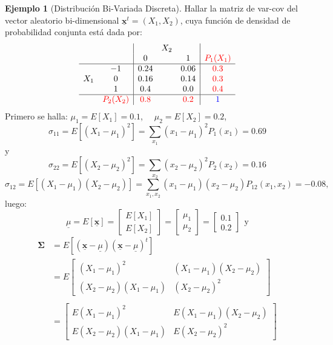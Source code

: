 \documentclass[
]{book}
\theoremstyle{definition}
\theoremstyle{definition}
\newtheorem{example}{Ejemplo}[chapter]
\theoremstyle{definition}
\theoremstyle{definition}
\theoremstyle{remark}
\begin{document}
\begin{example}[Distribución Bi-Variada Discreta]
\protect\hypertarget{exm:distrib-bivar}{}\label{exm:distrib-bivar}Hallar la matriz de var-cov del vector aleatorio bi-dimensional \(\underline{\mathbf{x}}^t=(X_1,X_2)\), cuya función de densidad de probabilidad conjunta está dada por:
\[
\begin{array}{cc|ccc|c}
&  & & X_2 & & \\
&  & 0 && 1 & \color{red}{ P_1(X_1)} \\\hline
& -1 & 0.24 && 0.06 & \color{red}{ 0.3}\\
X_1 & 0 & 0.16 && 0.14 & \color{red}{ 0.3} \\
& 1 & 0.4 && 0.0 & \color{red}{ 0.4} \\\hline
& \color{red}{ P_2(X_2)} & \color{red}{ 0.8} && \color{red}{ 0.2} & \color{blue}{ 1}
\end{array}
\]
Primero se halla: \(\mu_1=E[X_1]=0.1\), ~~\(\mu_2=E[X_2]=0.2\),
\[
\sigma_{11}=E[(X_1-\mu_1)^{2}]=\sum_{x_1} (x_1-\mu_1)^2P_1(x_1)=0.69
\]
y
\[
\sigma_{22}=E[(X_2-\mu_2)^{2}]=\sum_{x_2} (x_2-\mu_2)^2P_2(x_2)=0.16
\]
\[
\sigma_{12}=E[(X_1-\mu_1)(X_2-\mu_2)]=\sum_{x_1,x_2} (x_1-\mu_1)(x_2-\mu_2)P_{12}(x_1,x_2)=-0.08,
\]
luego:
\[
\underline{\mu}=E[\underline{\mathbf{x}}]=\begin{bmatrix}
E[X_1] \\ E[X_2]
\end{bmatrix}=
\begin{bmatrix}
\mu_1 \\ \mu_2
\end{bmatrix}=
  \begin{bmatrix}
0.1 \\ 0.2
\end{bmatrix} \ \ \text{y}
\]
\begin{align*}
\mathbf{\Sigma} &= E[(\underline{\mathbf{x}}-\underline{\mu})(\underline{\mathbf{x}}-\underline{\mu})^t]\\
&=E\begin{bmatrix}
(X_1-\mu_1)^2 & (X_1-\mu_1)(X_2-\mu_2)\\
(X_2-\mu_2)(X_1-\mu_1) & (X_2-\mu_2)^2
\end{bmatrix}\\ \\
&=\begin{bmatrix}
E(X_1-\mu_1)^2 & E(X_1-\mu_1)(X_2-\mu_2)\\
E(X_2-\mu_2)(X_1-\mu_1) & E(X_2-\mu_2)^2
\end{bmatrix}\\ \\

\end{align*}
\end{example}
\end{document}
